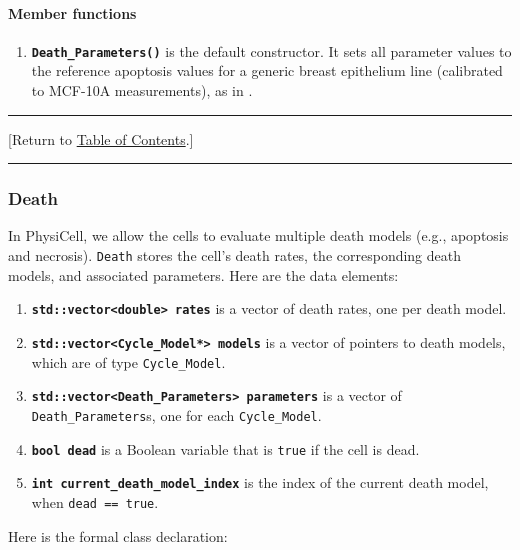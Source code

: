 \documentclass[12pt]{article}
\renewcommand{\v}{\verb}
\newcommand{\smallcode}[1]{\textbf{\texttt{#1}}}
\newcommand{\blue}[1]{\textcolor{blue}{#1}}
\newcommand{\DONE}{}%
\newcommand{\TOClink}{\begin{center}\hrule\vskip-10pt\phantom{.}\hfill[Return to \hyperlink{TOC}{Table of Contents}.]\hfill\phantom{.}\vskip3pt\hrule\end{center}}
\begin{document}
\paragraph{Member functions}
\begin{enumerate}
\item 
\smallcode{Death\_Parameters()} is the default constructor. It sets all 
parameter values to the reference apoptosis values for a 
generic breast epithelium line (calibrated to MCF-10A measurements), 
as in \cite{ref:PhysiCell}. 
\end{enumerate}

\TOClink 

\subsubsection{Death \DONE}
\label{sec:Death_Class}
In PhysiCell, we allow the cells to evaluate multiple death models (e.g., apoptosis and necrosis). 
\v|Death| stores the cell's death rates, the corresponding death models, and associated parameters. 
Here are the data elements: 
\begin{enumerate}
\item 
\smallcode{std::vector<double> rates} is a vector of death rates, one per death model. 

\item 
\smallcode{std::vector<Cycle\_Model*> models} is a vector of pointers to death models, 
which are of type \v|Cycle_Model|. 

\item 
\smallcode{std::vector<Death\_Parameters> parameters} is a vector of \v|Death_Parameters|s, 
one for each \v|Cycle_Model|.  

\item 
\smallcode{bool dead} is a Boolean variable that is \v|true| if the cell is dead. 

\item 
\smallcode{int current\_death\_model\_index} is the index of the current death model, 
when \v|dead == true|. 
\end{enumerate}

Here is the formal class declaration: 
\end{document}
